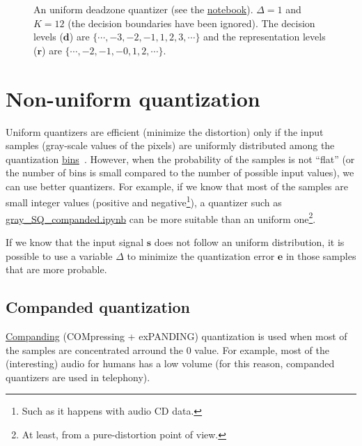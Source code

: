 \begin{figure}
  \caption{An uniform deadzone quantizer (see the
    \href{https://nbviewer.jupyter.org/github/vicente-gonzalez-ruiz/scalar_quantization/blob/master/graphics/deadzone.ipynb}{notebook}). $\Delta=1$
    and $K=12$ (the decision boundaries have been ignored). The
    decision levels (${\mathbf d}$) are
    $\{\cdots,-3,-2,-1,1,2,3,\cdots\}$ and the representation levels
    (${\mathbf r}$) are $\{\cdots,-2,-1,-0,1,2,\cdots\}$.}
  \label{fig:deadzone}
\end{figure}

\section{Non-uniform quantization}

Uniform quantizers are efficient (minimize the distortion) only if the
input samples (gray-scale values of the pixels) are uniformly
distributed among the quantization
\href{https://en.wikipedia.org/wiki/Data_binning}{bins}~\cite{vruiz__scalar_quantization}. However,
when the probability of the samples is not ``flat'' (or the number of
bins is small compared to the number of possible input values), we can
use better quantizers. For example, if we know that most of the
samples are small integer values (positive and negative\footnote{Such
  as it happens with audio CD data.}), a quantizer such as
\href{https://github.com/Sistemas-Multimedia/Sistemas-Multimedia.github.io/blob/master/contents/gray_SQ/gray_SQ_companded.ipynb}{gray\_SQ\_companded.ipynb}
can be more suitable than an uniform one\footnote{At least, from a
  pure-distortion point of view.}.

If we know that the input signal ${\mathbf s}$ does not follow an
uniform distribution, it is possible to use a variable $\Delta$ to
minimize the quantization error ${\mathbf e}$ in those
samples that are more probable.


\subsection{Companded quantization~\cite{sayood2017introduction}}

\href{https://en.wikipedia.org/wiki/Companding}{Companding}
(COMpressing + exPANDING) quantization is used when most of the
samples are concentrated arround the $0$ value. For example, most of
the (interesting) audio for humans has a low volume (for this reason,
companded quantizers are used in telephony).

